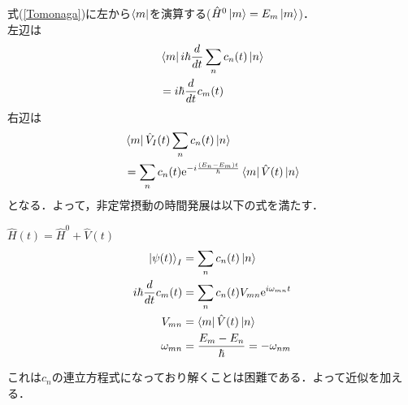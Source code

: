 \documentclass{report}
\begin{document}
  式(\ref{Tomonaga})に左から$\bra{m}$を演算する($\hat{H}^0\ket{m}=E_m\ket{m}$)．\\
  左辺は
  \begin{align}
    &\bra{m}i\hbar\frac{d}{dt}\sum_nc_n(t)\ket{n}\\
    &=i\hbar\frac{d}{dt}c_m(t)
  \end{align}
  右辺は
  \begin{align}
    &\bra{m}\hat{V}_I(t)\sum_{n}c_n(t)\ket{n}\\
    &=\sum_{n}c_n(t)\mathrm{e}^{-i\frac{(E_n-E_m)t}{\hbar}}\bra{m}\hat{V}(t)\ket{n}
  \end{align}
  となる．よって，非定常摂動の時間発展は以下の式を満たす．
  \begin{itembox}[l]{$\hat{H}(t)=\hat{H}^0+\hat{V}(t)$}
    \begin{align}
      \ket{\psi(t)}_I&=\sum_{n}c_n(t)\ket{n}\\
      i\hbar\frac{d}{dt}c_m(t)&=\sum_{n}c_n(t)V_{mn}\mathrm{e}^{i\omega_{mn}t}\\
      V_{mn}&=\bra{m}\hat{V}(t)\ket{n}\\
      \omega_{mn}&=\frac{E_m-E_n}{\hbar}=-\omega_{nm}
    \end{align}
  \end{itembox}
  これは$c_n$の連立方程式になっており解くことは困難である．よって近似を加える．
\end{document}
